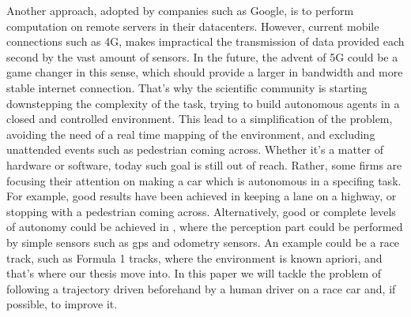 Another approach, adopted by companies such as Google, is to perform computation on remote servers in their datacenters. However, current mobile connections such as 4G, makes impractical the transmission of data provided each second by the vast amount of sensors.
In the future, the advent of 5G could be a game changer in this sense, which should provide a larger in bandwidth and more stable internet connection.
That's why the scientific community is starting downstepping the complexity of the task, trying to build autonomous agents in a closed and controlled environment. This lead to a simplification of the problem, avoiding the need of a real time mapping of the environment, and excluding unattended events such as pedestrian coming across.
Whether it's a matter of hardware or software, today such goal is still out of reach. Rather, some firms are focusing their attention on making a car which is autonomous in a specifing task. For example, good results have been achieved in keeping a lane on a highway, or stopping with a pedestrian coming across. 
Alternatively, good or complete levels of autonomy could be achieved in , where the perception part could be performed by simple sensors such as gps and odometry sensors.
An example could be a race track, such as Formula 1 tracks, where the environment is known apriori, and that's where our thesis move into.
In this paper we will tackle the problem of following a trajectory driven beforehand by a human driver on a race car and, if possible, to improve it.
